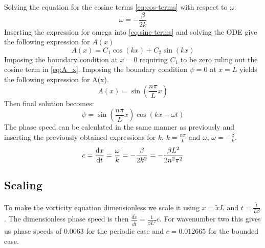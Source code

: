Solving the equation for the cosine terms \cref{eq:cos-terms} with respect to
$\omega$:
\begin{equation}
    \omega = -\frac{\beta}{2k}
\end{equation}
Inserting the expression for omega into \cref{eq:sine-terms} and solving the ODE
give the following expression for $A(x)$
\begin{equation}\label{eq:A_x}
    A(x) = C_1 \cos{(kx) + C_2 \sin{(kx)}}
\end{equation}
Imposing the boundary condition at $x=0$ requiring $C_1$ to be zero ruling
out the cosine term in \cref{eq:A_x}. Imposing the boundary condition $\psi=0$
at $x=L$ yields the following expression for A(x).
\begin{equation}
    A(x) = \sin{\left(\frac{n\pi}{L} x \right)}
\end{equation}
Then final solution becomes:
\begin{equation}
    \psi = \sin{\left(\frac{n\pi}{L} x \right)} \cos{(kx - \omega t)}
\end{equation}
The phase speed can be calculated in the same manner as previously and inserting
the previously obtained expressions for $k$, $k=\frac{n\pi}{L}$ and $\omega$,
$\omega = -\frac{\beta}{k}$.
\begin{equation}
    c = \dv{x}{t} = \frac{\omega}{k} = -\frac{\beta}{2k^2} = -\frac{\beta L^2}{2 n^2 \pi^2}
\end{equation}



\subsection{Scaling}

To make the vorticity equation dimensionless we scale it using $x = \tilde{x} L $ and $t = \frac{\tilde{t}}{L \beta}$. The dimensionless phase speed is then $\frac{d\tilde{x}}{d\tilde{t}} = \frac{1}{\beta L^2} c$. For wavenumber two this gives us phase speeds of
$0.0063$ for the periodic case and $c = 0.012665$ for the bounded case.
